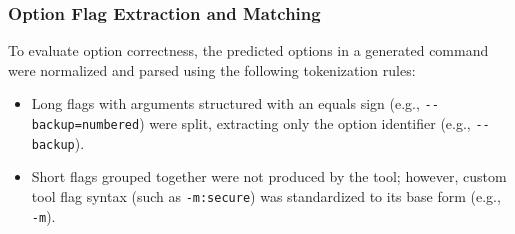 \subsubsection{Option Flag Extraction and Matching}
To evaluate option correctness, the predicted options in a generated command were normalized and parsed using the following tokenization rules:
\begin{itemize}
    \item Long flags with arguments structured with an equals sign (e.g., \texttt{-{}-backup=numbered}) were split, extracting only the option identifier (e.g., \texttt{-{}-backup}).
    \item Short flags grouped together were not produced by the tool; however, custom tool flag syntax (such as \texttt{-m:secure}) was standardized to its base form (e.g., \texttt{-m}).
\end{itemize}